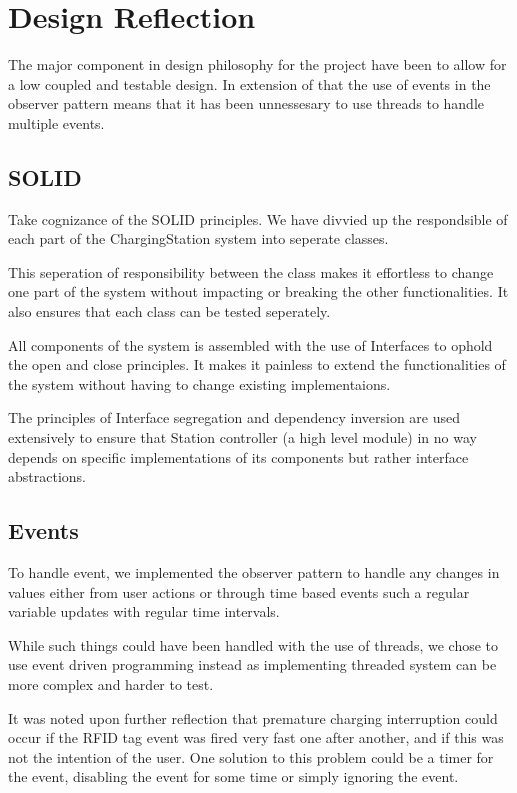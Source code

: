 \section{Design Reflection}

The major component in design philosophy for the project have been to 
allow for a low coupled and testable design. In extension of that
the use of events in the observer pattern means that it has 
been unnessesary to use threads to handle multiple events.

\subsection{SOLID}

Take cognizance of the SOLID principles. We have divvied up the respondsible 
of each part of the ChargingStation system into seperate classes. 

This seperation of responsibility between the class makes it effortless to change 
one part of the system without impacting or breaking the other functionalities.
It also ensures that each class can be tested seperately. 

All components of the system is assembled with the use of Interfaces to ophold the
open and close principles. It makes it painless to extend the functionalities of
the system without having to change existing implementaions.

The principles of Interface segregation and dependency inversion are used extensively
to ensure that Station controller (a high level module) in no way depends on specific
implementations of its components but rather interface abstractions. 


\subsection{Events}

To handle event, we implemented the observer pattern to handle any changes in values
either from user actions or through time based events such a regular variable updates
with regular time intervals.

While such things could have been handled with the use of threads, we chose to use
event driven programming instead as implementing threaded system can be more complex
and harder to test.

It was noted upon further reflection that premature charging interruption could occur if the RFID tag event was fired very fast one after another, and if this was not the intention of the user. 
One solution to this problem could be a timer for the event, disabling the event for some time or simply ignoring the event.  

